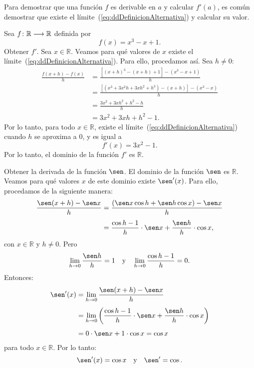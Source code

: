 Para demostrar que una función $f$ es derivable en $a$ y calcular $f'(a)$, es común demostrar que
existe el límite~(\ref{eq:ddDefinicionAlternativa}) y calcular su valor.

\begin{exemplo}[Solución]{%
Sea $f\colon \mathbb{R}\longrightarrow \mathbb{R}$ definida por
\[
f(x) = x^3 - x + 1.
\]
Obtener $f'$.
}%
Sea $x\in\mathbb{R}$. Veamos para qué valores de $x$ existe el
límite~(\ref{eq:ddDefinicionAlternativa}). Para ello, procedamos así. Sea $h\neq 0$:
\begin{align*}
\frac{f(x + h) - f(x)}{h} &= \frac{[(x+h)^3 - (x+h) + 1] - (x^3 - x + 1)}{h} \\[4pt]
  &= \frac{[(x^3 + 3x^2h + 3xh^2 + h^3) - (x+h)] - (x^3 - x)}{h} \\[4pt]
  &= \frac{3x^2 + 3xh^2 + h^2 - h}{h} \\
  &= 3x^2 + 3xh + h^2 - 1.
\end{align*}
Por lo tanto, para todo $x\in\mathbb{R}$, existe el límite~(\ref{eq:ddDefinicionAlternativa})
cuando $h$ se aproxima a $0$, y es igual a
\[
f'(x) = 3x^2 - 1.
\]
Por lo tanto, el dominio de la función $f'$ es $\mathbb{R}$.
\end{exemplo}

\begin{exemplo}[Solución]{%
Obtener la derivada de la función $\sen$.
}%
El dominio de la función $\sen$ es $\mathbb{R}$. Veamos para qué valores $x$ de este dominio existe
$\sen'(x)$. Para ello, procedamos de la siguiente manera:
\begin{align*}
\frac{\sen(x + h) - \sen x}{h} &= \frac{(\sen x\cos h + \sen h\cos x) - \sen x}{h} \\[4pt]
  &= \frac{\cos h - 1}{h}\cdot\sen x + \frac{\sen h}{h}\cdot\cos x,
\end{align*}
con $x\in\mathbb{R}$ y $h\neq 0$. Pero
\[
\limjc{\frac{\sen h}{h}}{h}{0} = 1 \yjc \limjc{\frac{\cos h - 1}{h}}{h}{0} = 0.
\]
Entonces:
\begin{align*}
\sen'(x) &= \limjc{\frac{\sen(x + h) - \sen x}{h}}{h}{0} \\[4pt]
  &= \limjc{\left(\frac{\cos h -1}{h}\cdot\sen x + \frac{\sen h}{h}\cdot\cos x\right)}{h}{0} \\[4pt]
  &= 0\cdot\sen x + 1\cdot\cos x = \cos x
\end{align*}
para todo $x\in\mathbb{R}$. Por lo tanto:
\[
\sen'(x) = \cos x \yjc \sen' = \cos.
\]
\end{exemplo}

